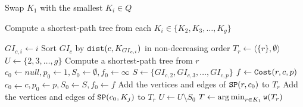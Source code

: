 \begin{algorithm}[t]
    
    Swap $K_1$ with the smallest $K_i \in Q$\;
    
    Compute a shortest-path tree from each $K_i\in \{K_2,K_3,\dots,K_g\}$\;
    
    {
        {
            $GI_{c,i} \leftarrow i$\;
        }
        Sort $GI_c$ by $\dist(c,K_{GI_{c,i}})$ in non-decreasing order\;
    }
    {
        $T_{r} \leftarrow \langle \{r\},\emptyset\rangle$\;
        $U \leftarrow \{2,3,\dots,g\}$\;
        Compute a shortest-path tree from $r$\;
        {
            $c_0 \leftarrow null, p_0 \leftarrow 1, S_0 \leftarrow \emptyset, f_0 \leftarrow \infty$\;
            {
                {
                    $S \leftarrow \{GI_{c,2},GI_{c,3},\dots,GI_{c,p}\}$\;
                    $f \leftarrow \Cost(r,c,p)$\;
                    {
                        $c_0 \leftarrow c, p_0 \leftarrow p, S_0 \leftarrow S, f_0 \leftarrow f$\;
                    }
                }
            }
            Add the vertices and edges of \(\SP(r,c_0)\) to \(T_r\)\;
            {
                Add the vertices and edges of \(\SP(c_0,K_j)\) to \(T_r\)\;
            }
            $U \leftarrow U \setminus S_0$\; 
        }
    }
    $T \leftarrow \argmin_{r \in K_1}{\w(T_{r})}$\;
\caption{\Basic} 
\label{alg: Basic}
\end{algorithm}

